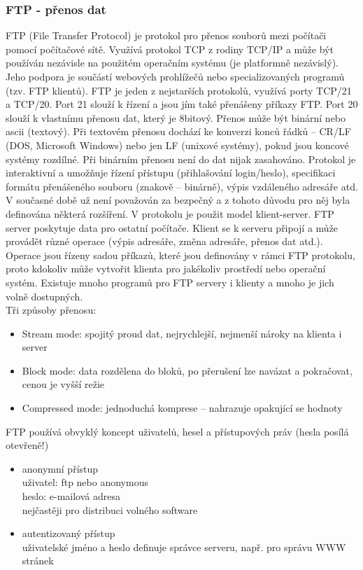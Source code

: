 \documentclass[10pt,a4paper]{article}
\begin{document}
\subsubsection{FTP - přenos dat}
FTP (File Transfer Protocol) je protokol pro přenos souborů mezi počítači pomocí počítačové sítě. Využívá protokol TCP z rodiny TCP/IP a může být používán nezávisle na použitém operačním systému (je platformně nezávislý). Jeho podpora je součástí webových prohlížečů nebo specializovaných programů (tzv. FTP klientů). FTP je jeden z nejstarších protokolů, využívá porty TCP/21 a TCP/20. Port 21 slouží k řízení a jsou jím také přenášeny příkazy FTP. Port 20 slouží k vlastnímu přenosu dat, který je 8bitový. Přenos může být binární nebo ascii (textový). Při textovém přenosu dochází ke konverzi konců řádků – CR/LF (DOS, Microsoft Windows) nebo jen LF (unixové systémy), pokud jsou koncové systémy rozdílné. Při binárním přenosu není do dat nijak zasahováno. Protokol je interaktivní a umožňuje řízení přístupu (přihlašování login/heslo), specifikaci formátu přenášeného souboru (znakově – binárně), výpis vzdáleného adresáře atd. V současné době už není považován za bezpečný a z tohoto důvodu pro něj byla definována některá rozšíření. V protokolu je použit model klient-server. FTP server poskytuje data pro ostatní počítače. Klient se k serveru připojí a může provádět různé operace (výpis adresáře, změna adresáře, přenos dat atd.). Operace jsou řízeny sadou příkazů, které jsou definovány v rámci FTP protokolu, proto kdokoliv může vytvořit klienta pro jakékoliv prostředí nebo operační systém. Existuje mnoho programů pro FTP servery i klienty a mnoho je jich volně dostupných. \\
Tři způsoby přenosu:
\begin{itemize}
	\item Stream mode: spojitý proud dat, nejrychlejší, nejmenší nároky na klienta i server
	\item Block mode: data rozdělena do bloků, po přerušení lze navázat a pokračovat, cenou je vyšší režie
	\item Compressed mode: jednoduchá komprese – nahrazuje opakující se hodnoty
\end{itemize}
FTP používá obvyklý koncept uživatelů, hesel a přístupových práv (hesla posílá otevřeně!)
\begin{itemize}
	\item anonymní přístup \\
	uživatel: ftp nebo anonymous \\
	heslo: e-mailová adresa \\
	nejčastěji pro distribuci volného software
	\item autentizovaný přístup \\
	uživatelské jméno a heslo definuje správce serveru, např. pro správu WWW stránek
\end{itemize}
\end{document}
